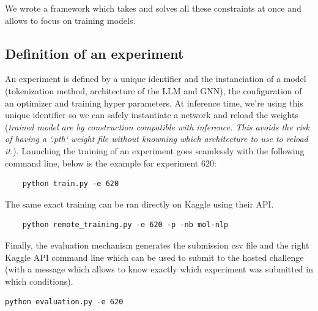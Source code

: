 We wrote a framework which takes and solves all these constraints at once and allows to focus on training models.

\subsection*{Definition of an experiment}
An experiment is defined by a unique identifier and the instanciation of a model (tokenization method, architecture of the LLM and GNN), the configuration of an  optimizer and training hyper parameters. At inference time, we're using this unique identifier so we can safely instantiate a network and reload the weights (\textit{trained model are by construction compatible with inference. This avoids the risk of having a `.pth` weight file without knowning which architecture to use to reload it.}).
Launching the training of an experiment goes seamlessly with the following command line, below is the example for experiment 620:
\begin{verbatim}
    python train.py -e 620
\end{verbatim}

The same exact training can be ran directly on Kaggle using their API.
\begin{verbatim}
    python remote_training.py -e 620 -p -nb mol-nlp
\end{verbatim}
Finally, the evaluation mechanism generates the submission csv file and the right Kaggle API command line which can be used to submit to the hosted challenge (with a message which allows to know exactly which experiment was submitted in which conditions).

\begin{verbatim}
python evaluation.py -e 620
\end{verbatim}

